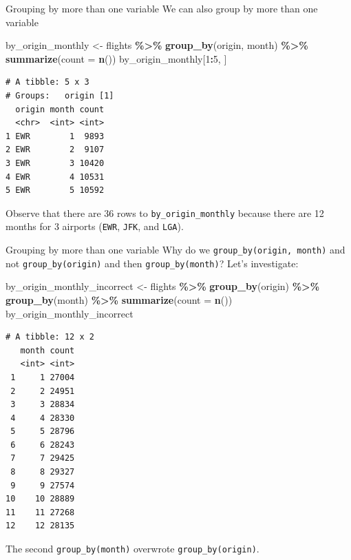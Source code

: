 \documentclass[
  ignorenonframetext,
]{beamer}
\newenvironment{Shaded}{\begin{snugshade}}{\end{snugshade}}
\newcommand{\AttributeTok}[1]{\textcolor[rgb]{0.13,0.29,0.53}{#1}}
\newcommand{\DecValTok}[1]{\textcolor[rgb]{0.00,0.00,0.81}{#1}}
\newcommand{\FunctionTok}[1]{\textcolor[rgb]{0.13,0.29,0.53}{\textbf{#1}}}
\newcommand{\NormalTok}[1]{#1}
\newcommand{\OtherTok}[1]{\textcolor[rgb]{0.56,0.35,0.01}{#1}}
\newcommand{\SpecialCharTok}[1]{\textcolor[rgb]{0.81,0.36,0.00}{\textbf{#1}}}
\begin{document}
\begin{frame}[fragile]{Grouping by more than one variable}
\protect\hypertarget{grouping-by-more-than-one-variable}{}
We can also group by more than one variable

\small

\begin{Shaded}
\begin{Highlighting}[]
\NormalTok{by\_origin\_monthly }\OtherTok{\textless{}{-}}\NormalTok{ flights }\SpecialCharTok{\%\textgreater{}\%} 
  \FunctionTok{group\_by}\NormalTok{(origin, month) }\SpecialCharTok{\%\textgreater{}\%} 
  \FunctionTok{summarize}\NormalTok{(}\AttributeTok{count =} \FunctionTok{n}\NormalTok{())}
\NormalTok{by\_origin\_monthly[}\DecValTok{1}\SpecialCharTok{:}\DecValTok{5}\NormalTok{, ]}
\end{Highlighting}
\end{Shaded}

\begin{verbatim}
# A tibble: 5 x 3
# Groups:   origin [1]
  origin month count
  <chr>  <int> <int>
1 EWR        1  9893
2 EWR        2  9107
3 EWR        3 10420
4 EWR        4 10531
5 EWR        5 10592
\end{verbatim}

\normalsize

Observe that there are 36 rows to \texttt{by\_origin\_monthly} because
there are 12 months for 3 airports (\texttt{EWR}, \texttt{JFK}, and
\texttt{LGA}).
\end{frame}

\begin{frame}[fragile]{Grouping by more than one variable}
\protect\hypertarget{grouping-by-more-than-one-variable-1}{}
Why do we \texttt{group\_by(origin,\ month)} and not
\texttt{group\_by(origin)} and then \texttt{group\_by(month)}? Let's
investigate:

\tiny

\begin{Shaded}
\begin{Highlighting}[]
\NormalTok{by\_origin\_monthly\_incorrect }\OtherTok{\textless{}{-}}\NormalTok{ flights }\SpecialCharTok{\%\textgreater{}\%} 
  \FunctionTok{group\_by}\NormalTok{(origin) }\SpecialCharTok{\%\textgreater{}\%} 
  \FunctionTok{group\_by}\NormalTok{(month) }\SpecialCharTok{\%\textgreater{}\%} 
  \FunctionTok{summarize}\NormalTok{(}\AttributeTok{count =} \FunctionTok{n}\NormalTok{())}
\NormalTok{by\_origin\_monthly\_incorrect}
\end{Highlighting}
\end{Shaded}

\begin{verbatim}
# A tibble: 12 x 2
   month count
   <int> <int>
 1     1 27004
 2     2 24951
 3     3 28834
 4     4 28330
 5     5 28796
 6     6 28243
 7     7 29425
 8     8 29327
 9     9 27574
10    10 28889
11    11 27268
12    12 28135
\end{verbatim}

\normalsize

The second \texttt{group\_by(month)} overwrote
\texttt{group\_by(origin)}.
\end{frame}
\end{document}
